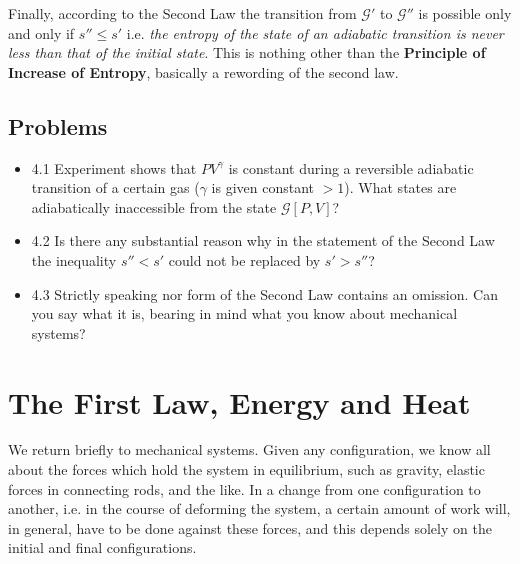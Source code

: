 \documentclass{article}
\theoremstyle{definition}
\begin{document}
Finally, according to the Second Law the transition from $\mathcal{G}'$ to $\mathcal{G}''$ is possible only and only if $s''\leq s'$ i.e. \textit{the entropy of the state of an adiabatic transition is never less than that of the initial state}. This is nothing other than the \textbf{Principle of Increase of Entropy}, basically a rewording of the second law.

\subsection{Problems}
\begin{itemize}
\item 4.1 Experiment shows that \(PV^\gamma\) is constant during a reversible adiabatic transition of a certain gas (\(\gamma\) is given constant \(> 1\)). What states are adiabatically inaccessible from the state \(\mathcal{G}[P, V]\)?
\item 4.2 Is there any substantial reason why in the statement of the Second Law the inequality \(s'' < s'\) could not be replaced by \(s' > s''\)?
\item 4.3 Strictly speaking nor form of the Second Law contains an omission. Can you say what it is, bearing in mind what you know about mechanical systems?
\end{itemize}


\section{The First Law, Energy and Heat}

We return briefly to mechanical systems. Given any configuration, we know all about the forces which hold the system in equilibrium, such as gravity, elastic forces in connecting rods, and the like. In a change from one configuration to another, i.e. in the course of deforming the system, a certain amount of work will, in general, have to be done against these forces, and this depends solely on the initial and final configurations.
\end{document}
